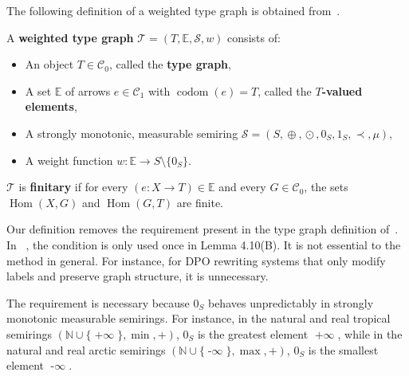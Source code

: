 The following definition of a weighted type graph is obtained from~\cite[Def. 3.1]{endrullis2024generalized}.
\begin{definition}
    \label{def:weighted_type_graph}
    A \textbf{weighted type graph} \(\mathcal{T} \mathop{=} (T, \mathbb{E}, \mathcal{S}, w)\) consists of:
    \begin{itemize}
        \item An object \(T \mathop{\in} \mathcal{C}_0\), called the \textbf{type graph},
        \item A set \(\mathbb{E}\) of arrows \(e \mathop{\in} \mathcal{C}_1\) with \(\operatorname{codom}(e) \mathop{=} T\), called the \textbf{\(T\)-valued elements}, 
        \item A strongly monotonic, measurable semiring \(\mathcal{S}=(S, \mathop{\oplus}, \mathop{\odot}, 0_S, 1_S, \prec, \mu)\),
        \item A weight function \(w : \mathbb{E} \mathop{\to} S \mathop{\setminus} \{0_S\}\).
    \end{itemize}
    \(\mathcal{T}\) is \textbf{finitary} if for every \((e:X \mathop{\to} T) \mathop{\in} \mathbb{E}\) and every \(G \mathop{\in} \mathcal{C}_0\), the sets \(\operatorname{Hom}(X, G)\) and \(\operatorname{Hom}(G, T)\) are finite.
\end{definition}
\begin{remark}
    \label{remark:greater_than_1}
    Our definition removes the requirement  present in the type graph definition of~\cite{endrullis2024generalized}. In ~\cite{endrullis2024generalized}, the condition is only used 
    once in Lemma 4.10(B).
    It is not essential to the method in general. For instance, for DPO rewriting systems that only modify labels and preserve graph structure, it is unnecessary.
\end{remark} 
\begin{remark}
    \label{remark:semiring_0_unpredictable}
    The requirement  is necessary because \(0_S\) behaves unpredictably in strongly monotonic measurable semirings. For instance, in the natural and real tropical semirings \((\mathbb{N} \mathop{\cup} \{\mathop{+\infty}\}, \mathop{\min}, +)\), \(0_S\) is the greatest element \(\mathop{+\infty}\), while in the natural and real arctic semirings \((\mathbb{N} \mathop{\cup} \{\mathop{-\infty}\}, \max, +)\), \(0_S\) is the smallest element \(\mathop{-\infty}\).
\end{remark}